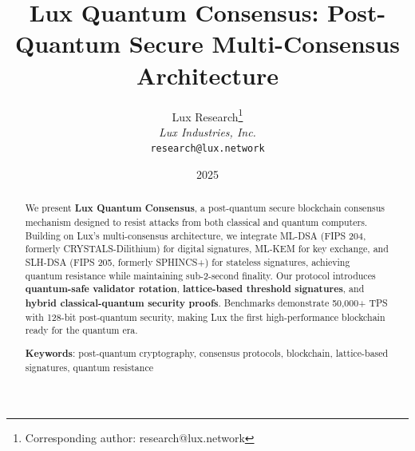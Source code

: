 \documentclass[11pt,letterpaper]{article}
\title{Lux Quantum Consensus: Post-Quantum Secure Multi-Consensus Architecture}
\author{
Lux Research\thanks{Corresponding author: research@lux.network}\\
\textit{Lux Industries, Inc.}\\
\texttt{research@lux.network}
}
\date{2025}
\begin{document}
\luxcoverpage

\begin{abstract}
We present \textbf{Lux Quantum Consensus}, a post-quantum secure blockchain consensus mechanism designed to resist attacks from both classical and quantum computers. Building on Lux's multi-consensus architecture, we integrate ML-DSA (FIPS 204, formerly CRYSTALS-Dilithium) for digital signatures, ML-KEM for key exchange, and SLH-DSA (FIPS 205, formerly SPHINCS+) for stateless signatures, achieving quantum resistance while maintaining sub-2-second finality. Our protocol introduces \textbf{quantum-safe validator rotation}, \textbf{lattice-based threshold signatures}, and \textbf{hybrid classical-quantum security proofs}. Benchmarks demonstrate 50,000+ TPS with 128-bit post-quantum security, making Lux the first high-performance blockchain ready for the quantum era.

\textbf{Keywords}: post-quantum cryptography, consensus protocols, blockchain, lattice-based signatures, quantum resistance
\end{abstract}












\end{document}
